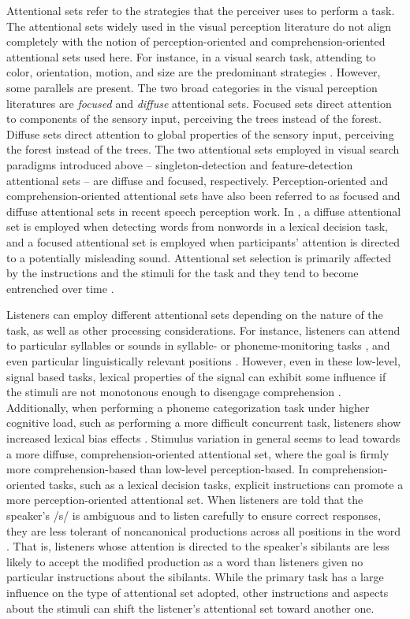 Attentional sets refer to the strategies that the perceiver uses to perform a task.
The attentional sets widely used in the visual perception literature do not align completely with the notion of perception-oriented and comprehension-oriented attentional sets used here.
For instance, in a visual search task, attending to color, orientation, motion, and size are the predominant strategies \citep{Wolfe2004}.
However, some parallels are present.
The two broad categories in the visual perception literatures are \emph{focused} and \emph{diffuse} attentional sets.
Focused sets direct attention to components of the sensory input, perceiving the trees instead of the forest. 
Diffuse sets direct attention to global properties of the sensory input, perceiving the forest instead of the trees.  
The two attentional sets employed in visual search paradigms introduced above -- singleton-detection and feature-detection attentional sets -- are diffuse and focused, respectively.
Perception-oriented and comprehension-oriented attentional sets have also been referred to as focused and diffuse attentional sets in recent speech perception work.
In \citet{Pitt2012}, a diffuse attentional set is employed when detecting words from nonwords in a lexical decision task, and a focused attentional set is employed when participants' attention is directed to a potentially misleading sound.
Attentional set selection is primarily affected by the instructions and the stimuli for the task and they tend to become entrenched over time \citep{Leber2006}.

Listeners can employ different attentional sets depending on the nature of the task, as well as other processing considerations.
For instance, listeners can attend to particular syllables or sounds in syllable- or phoneme-monitoring tasks \citep[and others]{Norris1988}, and even particular linguistically relevant positions \citep{Pitt1990}.
However, even in these low-level, signal based tasks, lexical properties of the signal can exhibit some influence if the stimuli are not monotonous enough to disengage comprehension \citep{Cutler1987}.  
Additionally, when performing a phoneme categorization task under higher cognitive load, such as performing a more difficult concurrent task, listeners show increased lexical bias effects \citep{Mattys2011}.
Stimulus variation in general seems to lead towards a more diffuse, comprehension-oriented attentional set, where the goal is firmly more comprehension-based than low-level perception-based.
In comprehension-oriented tasks, such as a lexical decision tasks, explicit instructions can promote a more perception-oriented attentional set.
When listeners are told that the speaker's /s/ is ambiguous and to listen carefully to ensure correct responses, they are less tolerant of noncanonical productions across all positions in the word \citep{Pitt2012}.  
That is, listeners whose attention is directed to the speaker's sibilants are less likely to accept the modified production as a word than listeners given no particular instructions about the sibilants.
While the primary task has a large influence on the type of attentional set adopted, other instructions and aspects about the stimuli can shift the listener's attentional set toward another one.

